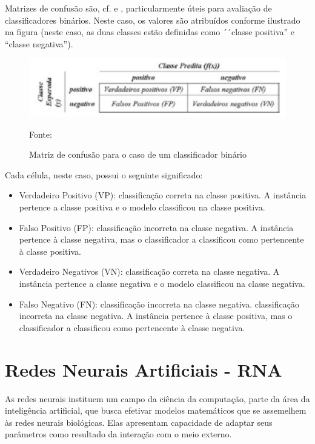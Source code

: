 Matrizes de confusão são, cf. \cite{ruuska_evaluation_2018}e \cite{Boscarioli2017}, particularmente úteis para avaliação de classificadores binários. Neste caso, os valores são atribuídos conforme ilustrado na figura (neste caso, as duas classes estão definidas como ´´classe positiva'' e ``classe negativa''). 

\begin{figure}[h!]
	\centering
	\includegraphics[width=.6\textwidth]{imagens/matriz_confusao_binario.png}
	\caption{Matriz de confusão para o caso de um classificador binário}
	{\scriptsize Fonte: \cite[p. 131]{Boscarioli2017}}
	\label{fig:binario_matriz_confusao}
\end{figure}

Cada célula, neste caso, possui o seguinte significado:

\begin{itemize}
	\item Verdadeiro Positivo (VP): classificação correta na classe positiva. A instância pertence a classe positiva e o modelo classificou na classe positiva.
	\item Falso Positivo (FP): classificação incorreta na classe negativa. A instância pertence à classe negativa, mas o classificador a classificou como pertencente à classe positiva.
	\item Verdadeiro Negativos (VN): classificação correta na classe negativa. A instância pertence a classe negativa e o modelo classificou na classe negativa.
	\item Falso Negativo (FN): classificação incorreta na classe negativa. classificação incorreta na classe negativa. A instância pertence à classe positiva, mas o classificador a classificou como pertencente à classe negativa. 
\end{itemize}


\section{Redes Neurais Artificiais - RNA}
As redes neurais instituem um campo da ciência da computação, parte da área da inteligência artificial, que busca efetivar modelos matemáticos que se assemelhem às redes neurais biológicas. Elas apresentam capacidade de adaptar seus parâmetros como resultado da interação com o meio externo. \cite{ferneda_redes_2006}\cite{Norvig2013}

